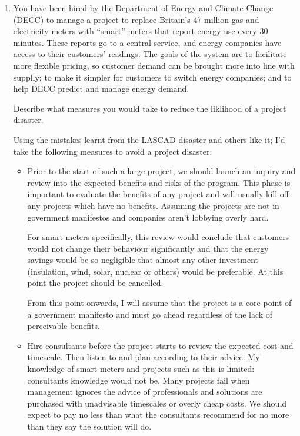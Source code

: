 \documentclass[10pt,\jkfside,a4paper]{article}
\begin{document}
\begin{enumerate}
\begin{enumerate}
\begin{enumerate}[label=(\roman*)]
\end{enumerate}

\item You have been hired by the Department of Energy and Climate Change (DECC) to manage a project to replace 
Britain's 47 million gas and electricity meters with ``smart'' meters that report energy use 
every 30 minutes. These reports go to a central service, and energy companies have access to their customers' 
readings. The goals of the system are to facilitate more flexible pricing, so customer demand can be brought 
more into line with supplly; to make it simpler for customers to switch energy companies; and to help DECC 
predict and manage energy demand. 

Describe what measures you would take to reduce the liklihood of a project disaster.

Using the mistakes learnt from the LASCAD disaster and others like it; I'd take the following measures to 
avoid a project disaster:

\begin{itemize}

\item Prior to the start of such a large project, we should launch an inquiry and review into the expected
benefits and risks of the program. This phase is important to evaluate the benefits of any project and will 
usually kill off any projects which have no benefits. Assuming the projects are not in government manifestos 
and companies aren't lobbying overly hard.

For smart meters specifically, this review would conclude that customers would not change their behaviour 
significantly and that the energy savings would be so negligible that almost any other investment (insulation, 
wind, solar, nuclear or others) would be preferable. At this point the project should be cancelled.

From this point onwards, I will assume that the project is a core point of a government manifesto and 
must go ahead regardless of the lack of perceivable benefits.

\item Hire consultants before the project starts to review the expected cost and timescale. Then listen to 
and plan according to their advice. My knowledge of smart-meters and projects such as this is limited: 
consultants knowledge would not be. Many projects fail when management ignores the advice of professionals and 
solutions are purchased with unadvisable timescales or overly cheap costs. We should expect to 
pay no less than what the consultants recommend for no more than they say the solution will do.


\end{itemize}
\end{enumerate}
\end{enumerate}
\end{document}
